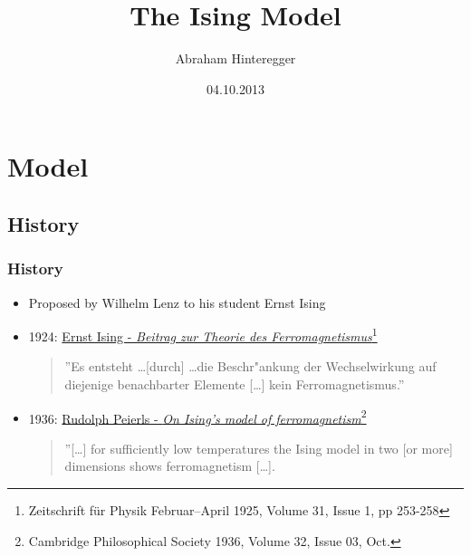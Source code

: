 \documentclass{beamer}
\begin{document}
\title{The Ising Model}
\author{Abraham Hinteregger}
\date{04.10.2013}
\titlepage
\setcounter{tocdepth}{4}
\section{Model} 
\subsection{History}
\begin{frame}\frametitle{History} 
\begin{itemize}%
\item Proposed by Wilhelm Lenz to his student Ernst Ising
\item 1924: \href{http://link.springer.com/content/pdf/10.1007 BF02980577.pdf}{Ernst Ising - \textit{Beitrag zur Theorie des Ferromagnetismus}\footnote{Zeitschrift für Physik Februar–April 1925, Volume 31, Issue 1, pp 253-258 }}
\begin{quote}
''Es entsteht \ldots [durch] \ldots die Beschr"ankung der Wechselwirkung auf diejenige  benachbarter Elemente [\ldots] kein Ferromagnetismus.''
\end{quote}
\item 1936: \href{http://journals.cambridge.org/action/displayAbstract?fromPage=online\&aid=2027260}{Rudolph Peierls - \textit{On Ising's model of ferromagnetism}\footnote{Cambridge Philosophical Society 1936, Volume 32, Issue 03, Oct.}}
\begin{quote}
''[\ldots] for sufficiently low temperatures the Ising model in two [or more] dimensions shows ferromagnetism [\ldots].
\end{quote}
\end{itemize}
\end{frame}

\end{document}
